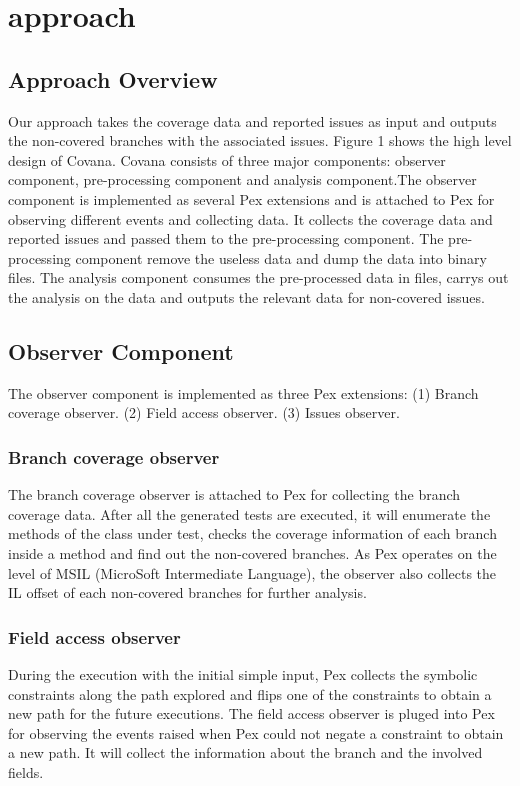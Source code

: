 \section{approach}
\subsection{Approach Overview}
Our approach takes the coverage data and reported issues as input and outputs the non-covered branches with the associated issues. Figure 1 shows the high level design of Covana. Covana consists of three major components: observer component, pre-processing component and analysis component.The observer component is implemented as several Pex extensions and is attached to Pex for observing different events and collecting data. It collects the coverage data and reported issues and passed them to the pre-processing component. The pre-processing component remove the useless data and dump the data into binary files. The analysis component consumes the pre-processed data in files, carrys out the analysis on the data and outputs the relevant data for non-covered issues.
\subsection{Observer Component}
The observer component is implemented as three Pex extensions: (1) Branch coverage observer. (2) Field access observer. (3) Issues observer.
\subsubsection{Branch coverage observer}
The branch coverage observer is attached to Pex for collecting the branch coverage data. After all the generated tests are executed, it will enumerate the methods of the class under test, checks the coverage information of each branch inside a method and find out the non-covered branches. As Pex operates on the level of MSIL (MicroSoft Intermediate Language)\cite{HalleuxT08}, the observer also collects the IL offset of each non-covered branches for further analysis.
\subsubsection{Field access observer}
During the execution with the initial simple input, Pex collects the symbolic constraints along the path explored and flips one of the constraints to obtain a new path for the future executions. The field access observer is pluged into Pex for observing the events raised when Pex could not negate a constraint to obtain a new path. It will collect the information about the branch and the involved fields. 
